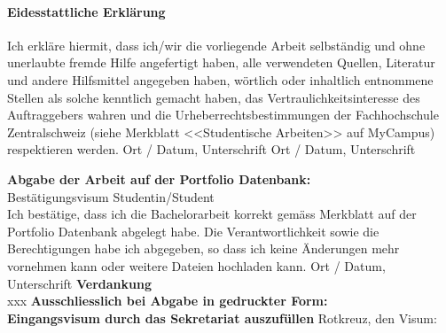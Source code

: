 	
	
	
	\paragraph{\textbf{Eidesstattliche Erkl\"arung}}
	Ich erkl\"are hiermit, dass ich/wir die vorliegende Arbeit selbst\"andig und ohne unerlaubte fremde Hilfe angefertigt haben, alle verwendeten Quellen, Literatur und andere Hilfsmittel angegeben haben, w\"ortlich oder inhaltlich entnommene Stellen als solche kenntlich gemacht haben, das Vertraulichkeitsinteresse des Auftraggebers wahren und die Urheberrechtsbestimmungen der Fachhochschule Zentralschweiz (siehe Merkblatt <<Studentische Arbeiten>> auf MyCampus) respektieren werden. \newline \newline 
	Ort / Datum, Unterschrift	\underline{\hspace*{4cm}} \newline \newline
	Ort / Datum, Unterschrift	\underline{\hspace*{4cm}} 
	
	
	\newpage
	\noindent
	\textbf{Abgabe der Arbeit auf der Portfolio Datenbank:}\\
	Best\"atigungsvisum Studentin/Student\\
	Ich best\"atige, dass ich die Bachelorarbeit korrekt gem\"ass Merkblatt auf der Portfolio Datenbank abgelegt habe. Die Verantwortlichkeit sowie die Berechtigungen habe ich abgegeben, so dass ich keine \"Anderungen mehr vornehmen kann oder weitere Dateien hochladen kann. \newline \newline 
	Ort / Datum, Unterschrift	\underline{\hspace*{4cm}} \newline \newline
	\textbf{Verdankung}\\
	{\color{red}xxx} \newline \newline \newline
	\noindent
	{\textbf{Ausschliesslich bei Abgabe in gedruckter Form: \\
			Eingangsvisum durch das Sekretariat auszuf\"ullen}} \newline \newline
	Rotkreuz, den	\underline{\hspace*{4cm}} \hspace*{1cm}	Visum:	\underline{\hspace*{4cm}} \vspace*{10cm}
	
